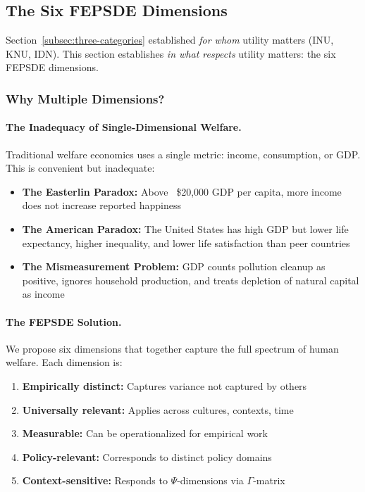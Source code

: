 \subsection{The Six FEPSDE Dimensions}
\label{subsec:fepsde-dimensions}


Section~\ref{subsec:three-categories} established \emph{for whom} utility matters 
(INU, KNU, IDN). This section establishes \emph{in what respects} utility matters:
the six FEPSDE dimensions.

\subsubsection{Why Multiple Dimensions?}

\paragraph{The Inadequacy of Single-Dimensional Welfare.}
Traditional welfare economics uses a single metric: income, consumption, or GDP.
This is convenient but inadequate:

\begin{itemize}
\item \textbf{The Easterlin Paradox:} Above ~\$20,000 GDP per capita, 
more income does not increase reported happiness \citep{easterlin1974does}

\item \textbf{The American Paradox:} The United States has high GDP but 
lower life expectancy, higher inequality, and lower life satisfaction 
than peer countries

\item \textbf{The Mismeasurement Problem:} GDP counts pollution cleanup 
as positive, ignores household production, and treats depletion of 
natural capital as income
\end{itemize}

\paragraph{The FEPSDE Solution.}
We propose six dimensions that together capture the full spectrum of 
human welfare. Each dimension is:

\begin{enumerate}
\item \textbf{Empirically distinct:} Captures variance not captured by others
\item \textbf{Universally relevant:} Applies across cultures, contexts, time
\item \textbf{Measurable:} Can be operationalized for empirical work
\item \textbf{Policy-relevant:} Corresponds to distinct policy domains
\item \textbf{Context-sensitive:} Responds to $\Psi$-dimensions via $\Gamma$-matrix
\end{enumerate}

